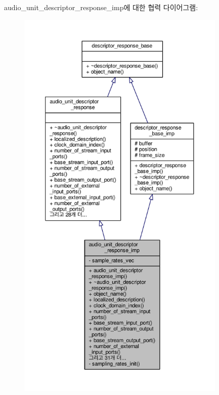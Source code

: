 audio\+\_\+unit\+\_\+descriptor\+\_\+response\+\_\+imp에 대한 협력 다이어그램\+:
\nopagebreak
\begin{figure}[H]
\begin{center}
\leavevmode
\includegraphics[height=550pt]{classavdecc__lib_1_1audio__unit__descriptor__response__imp__coll__graph}
\end{center}
\end{figure}
